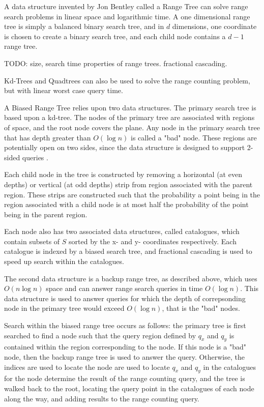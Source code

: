 \documentclass[mcs]{scsthesis}
\begin{document}
A data structure invented by Jon Bentley \cite{rangetree} called a Range Tree
can solve range search problems in linear space and logarithmic time. A one
dimensional range tree is simply a balanced binary search tree, and in \(d\)
dimensions, one coordinate is chosen to create a binary search tree, and each
child node contains a \(d - 1\) range tree. 

TODO: size, search time properties of range trees. fractional cascading.

Kd-Trees and Quadtrees can also be used to solve the range counting problem,
but with linear worst case query time.

A Biased Range Tree relies upon two data structures. The primary search tree
is based upon a kd-tree. The nodes of the primary tree are associated with
regions of space, and the root node covers the plane. Any node in the primary
search tree that has depth greater than \(O(\log n)\) is called a "bad" node.
These regions are potentially open on two sides, since the data structure is
designed to support 2-sided queries \cite{biasedrange}. 

Each child node in the tree is constructed by removing a horizontal (at even
depths) or vertical (at odd depths) strip from region associated with the
parent region. These strips are constructed such that the probability a point
being in the region associated with a child node is at most half the probability
of the point being in the parent region.

Each node also has two associated data structures, called catalogues, which
contain subsets of \(S\) sorted by the x- and y- coordinates respectively.
Each catalogue is indexed by a biased search tree, and fractional cascading is
used to speed up search within the catalogues.

The second data structure is a backup range tree, as described above, which
uses \(O(n \log n)\) space and can answer range search queries in time
\(O(\log n)\). This data structure is used to answer queries for which the
depth of correpsonding node in the primary tree would exceed \(O(\log n)\),
that is the "bad" nodes.

Search within the biased range tree occurs as follows: the primary tree is
first searched to find a node such that the query region defined by \(q_x\) and
\(q_y\) is contained within the region corresponding to the node. If this node
is a "bad" node, then the backup range tree is used to answer the query.
Otherwise, the indices are used to locate the node are used to locate \(q_x\)
and \(q_y\) in the catalogues for the node determine the result of the range
counting query, and the tree is walked back to the root, locating the query
point in the catalogues of each node along the way, and adding results to
the range counting query.
\end{document}

